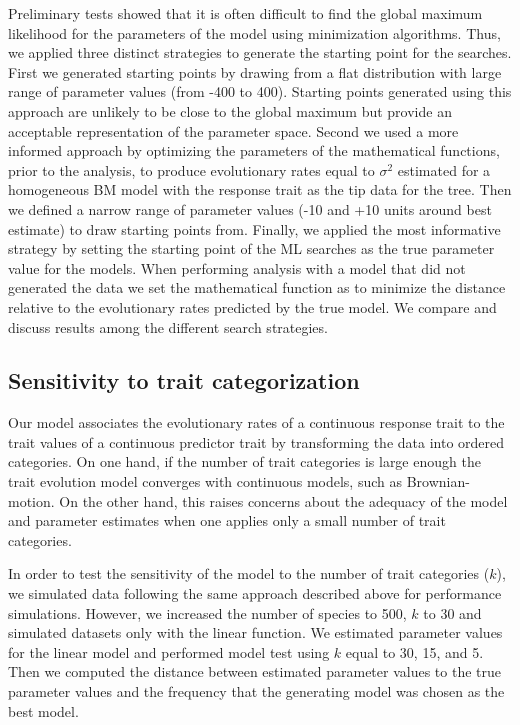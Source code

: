 Preliminary tests showed that it is often difficult to find the global maximum likelihood for the parameters of the model using minimization algorithms. Thus, we applied three distinct strategies to generate the starting point for the searches. First we generated starting points by drawing from a flat distribution with large range of parameter values (from -400 to 400). Starting points generated using this approach are unlikely to be close to the global maximum but provide an acceptable representation of the parameter space. Second we used a more informed approach by optimizing the parameters of the mathematical functions, prior to the analysis, to produce evolutionary rates equal to $\sigma^{2}$ estimated for a homogeneous BM model with the response trait as the tip data for the tree. Then we defined a narrow range of parameter values (-10 and +10 units around best estimate) to draw starting points from. Finally, we applied the most informative strategy by setting the starting point of the ML searches as the true parameter value for the models. When performing analysis with a model that did not generated the data we set the mathematical function as to minimize the distance relative to the evolutionary rates predicted by the true model. We compare and discuss results among the different search strategies.

\subsection{Sensitivity to trait categorization}

Our model associates the evolutionary rates of a continuous response trait to the trait values of a continuous predictor trait by transforming the data into ordered categories. On one hand, if the number of trait categories is large enough the trait evolution model converges with continuous models, such as Brownian-motion. On the other hand, this raises concerns about the adequacy of the model and parameter estimates when one applies only a small number of trait categories.

In order to test the sensitivity of the model to the number of trait categories ($\mathit{k}$), we simulated data following the same approach described above for performance simulations. However, we increased the number of species to 500, $\mathit{k}$ to 30 and simulated datasets only with the linear function. We estimated parameter values for the linear model and performed model test using $\mathit{k}$ equal to 30, 15, and 5. Then we computed the distance between estimated parameter values to the true parameter values and the frequency that the generating model was chosen as the best model. 








